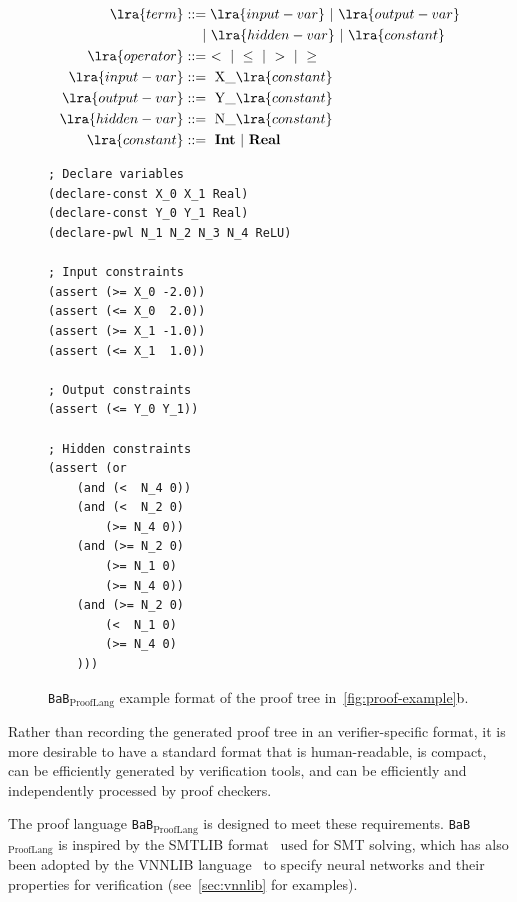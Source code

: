 \documentclass[oneside,11pt,dvipsnames]{book}
\numberwithin{equation}{section}
\theoremstyle{definition}
\theoremstyle{remark}
\newcommand{\prooflang}{\texttt{BaB$_{\text{ProofLang}}$}}
\begin{document}
\begin{figure}
\begin{minipage}[b]{0.54\textwidth}
\begin{align*}
    \lra{term}          &::= \lra{input-var} \ | \ \lra{output-var} \\
                        & \quad ~| \ \lra{hidden-var} \ | \ \lra{constant} \\
    \lra{operator}      &::= ~ < \ | \ \leq \ | \ > \ | \ \geq \\
    \lra{input-var}     &::= ~\text{X\_}\lra{constant} \\
    \lra{output-var}    &::= ~\text{Y\_}\lra{constant} \\
    \lra{hidden-var}    &::= ~\text{N\_}\lra{constant} \\
    \lra{constant}      &::= ~\textbf{Int} \ | \ \textbf{Real}
\end{align*}
\caption{The \prooflang{} proof language.}\label{fig:grammar}
\end{minipage}
\hfill
\begin{minipage}[b]{0.45\textwidth}
\begin{lstlisting}[style=SMTLIB-style, language=SMTLIB, basicstyle=\ttfamily\scriptsize,numbers=none]
; Declare variables
(declare-const X_0 X_1 Real)
(declare-const Y_0 Y_1 Real)
(declare-pwl N_1 N_2 N_3 N_4 ReLU)

; Input constraints
(assert (>= X_0 -2.0))
(assert (<= X_0  2.0))
(assert (>= X_1 -1.0))
(assert (<= X_1  1.0))

; Output constraints
(assert (<= Y_0 Y_1))

; Hidden constraints
(assert (or
    (and (<  N_4 0))
    (and (<  N_2 0)
        (>= N_4 0))
    (and (>= N_2 0)
        (>= N_1 0)
        (>= N_4 0))
    (and (>= N_2 0)
        (<  N_1 0)
        (>= N_4 0)
    )))
\end{lstlisting}
\caption{\prooflang{} example format of the proof tree in~\autoref{fig:proof-example}b.
}
\label{fig:proof_example}
\end{minipage}
\end{figure}


Rather than recording the generated proof tree in an verifier-specific format, it is more desirable to have a standard format
that is human-readable, is compact, can be efficiently generated by verification tools, and can
be efficiently and independently processed by proof checkers.

The proof language \prooflang{} is designed to meet these requirements.
\prooflang{} is inspired by the SMTLIB format~\cite{barrett2010smt} used for SMT solving, which has also been adopted by the  VNNLIB language~\cite{vnnlib} to specify neural networks and their properties for verification (see~\autoref{sec:vnnlib} for examples).
\end{document}
